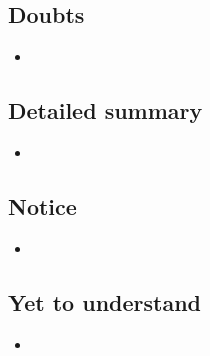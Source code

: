 \subsection{Doubts}

    \begin{itemize}

    \item 
    
    \end{itemize}

\subsection{Detailed summary}

    \begin{itemize}

    \item 
    
    \end{itemize}

\subsection{Notice}

    \begin{itemize}

    \item 
    
    \end{itemize}

\subsection{Yet to understand}

    \begin{itemize}

    \item 
    
    \end{itemize}